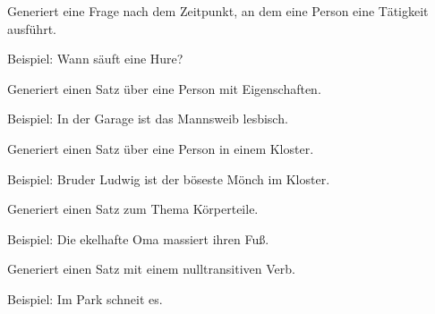 \documentclass[a4paper,12pt,oneside]{sphinxmanual}
\begin{document}

\begin{fulllineitems}
\label{module:pyzufall.satz.satz_frage_5}
Generiert eine Frage nach dem Zeitpunkt, an dem eine Person eine Tätigkeit ausführt.

Beispiel: Wann säuft eine Hure?

\end{fulllineitems}


\begin{fulllineitems}
\label{module:pyzufall.satz.satz_freunde_lieben}
Generiert einen Satz über eine Person mit Eigenschaften.

Beispiel: In der Garage ist das Mannsweib lesbisch.

\end{fulllineitems}


\begin{fulllineitems}
\label{module:pyzufall.satz.satz_kloster}
Generiert einen Satz über eine Person in einem Kloster.

Beispiel: Bruder Ludwig ist der böseste Mönch im Kloster.

\end{fulllineitems}


\begin{fulllineitems}
\label{module:pyzufall.satz.satz_koerperteil}
Generiert einen Satz zum Thema Körperteile.

Beispiel: Die ekelhafte Oma massiert ihren Fuß.

\end{fulllineitems}


\begin{fulllineitems}
\label{module:pyzufall.satz.satz_nulltransitiv}
Generiert einen Satz mit einem nulltransitiven Verb.

Beispiel: Im Park schneit es.

\end{fulllineitems}
\end{document}
